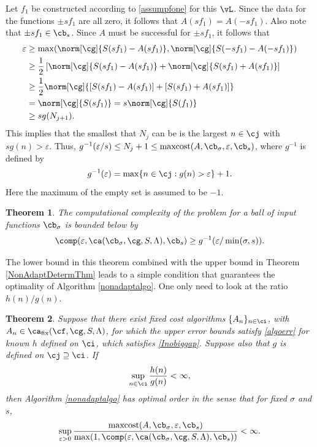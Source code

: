 \documentclass[]{elsarticle}
\DeclareMathOperator{\fix}{fix}
\DeclareMathOperator{\maxcost}{maxcost}
\newtheorem{theorem}{Theorem}
\theoremstyle{definition}
\theoremstyle{remark}
\begin{document}
Let $f_1$ be constructed according to \eqref{assumpfone} for this $\vL$.  Since the data for the functions $\pm s f_1$ are all zero, it follows that $A(s f_1)=A(-s f_1)$.  Also note that $\pm s f_1 \in \cb_{s}$.  Since $A$ must be successful for $\pm s f_1$, it follows that 
\begin{align*}
\varepsilon & \ge \max(\norm[\cg]{S(sf_1)-A(sf_1)},\norm[\cg]{S(-sf_1)-A(-sf_1)}) \\
& \ge \frac{1}{2} \left[ \norm[\cg]{S(sf_1)-A(sf_1)}+ \norm[\cg]{S(sf_1)+A(sf_1)} \right] \\
& \ge \frac{1}{2} \norm[\cg]{[S(sf_1)-A(sf_1)]+[S(sf_1)+A(sf_1)]} \\
& = \norm[\cg]{S(sf_1)}= s\norm[\cg]{S(f_1)}  \\
& \ge s g(N_{j+1}).
\end{align*}
This implies that the smallest that $N_{j}$ can be is the largest $n \in \cj$ with $s g(n) > \varepsilon$.  Thus, $g^{-1}(\varepsilon/s) \le N_{j}+1 \le \maxcost(A,\cb_{\sigma},\varepsilon,\cb_{s})$, where $g^{-1}$ is defined by
\begin{equation*} \label{ginvdef}
g^{-1}(\varepsilon) = \max \{ n \in \cj : g(n) > \varepsilon\}+1.
\end{equation*}
Here the maximum of the empty set is assumed to be $-1$.

\begin{theorem} \label{complowbdball} The computational complexity of the problem for a ball of input functions $\cb_{\sigma}$ is bounded below by
\begin{equation*}
\comp(\varepsilon,\ca(\cb_{\sigma},\cg,S,\Lambda),\cb_s) \ge
g ^{-1}(\varepsilon/\min(\sigma,s)).
\end{equation*}
\end{theorem}

The lower bound in this theorem combined with the upper bound in Theorem \ref{NonAdaptDetermThm} leads to a simple condition that guarantees the optimality of Algorithm \ref{nonadaptalgo}.  One only need to look at the ratio $h(n)/g(n)$.

\begin{theorem} \label{optimalprop} Suppose that there exist fixed cost algorithms $\{A_n\}_{n \in \ci}$, with $A_n  \in \ca_{\fix}(\cf,\cg,S,\Lambda)$, for which the upper error bounds satisfy \eqref{algoerr} for known $h$ defined on $\ci$, which satisfies \eqref{Inobiggap}.  Suppose also that $g$ is defined on $\cj \supseteq \ci$. If 
\begin{equation}\label{ghcond}
\sup_{n \in \ci} \frac{h(n)}{g(n)} < \infty,
\end{equation}
then Algorithm \ref{nonadaptalgo} has optimal order in the sense that for fixed $\sigma$ and $s$, 
\begin{equation*} \label{balloptresult}
\sup_{\varepsilon > 0} \frac{\maxcost(A,\cb_{\sigma},\varepsilon,\cb_{s})}
{\max(1,\comp(\varepsilon,\ca(\cb_{\sigma},\cg,S,\Lambda),\cb_s))} <\infty.
\end{equation*}
\end{theorem}
\end{document}

